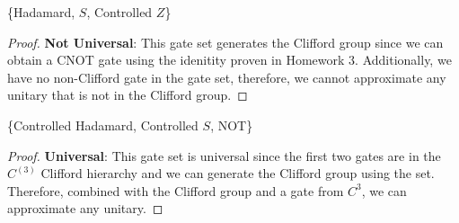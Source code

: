 \begin{solution}[label=ques:4e]
  \begin{question}
    \{Hadamard, $S$, Controlled $Z$\}
  \end{question}
  \tcblower{}
  \begin{proof}
    \textbf{Not Universal}: This gate set generates the Clifford group since we can obtain a CNOT gate using the idenitity proven in Homework 3. Additionally, we have no non-Clifford gate in the gate set, therefore, we cannot approximate any unitary that is not in the Clifford group.
  \end{proof}
\end{solution}

\begin{solution}[label=ques:4f]
  \begin{question}
    \{Controlled Hadamard, Controlled $S$, NOT\} 
  \end{question}
  \tcblower{}
  \begin{proof}
    \textbf{Universal}: This gate set is universal since the first two gates are in the $C^{(3)}$ Clifford hierarchy and we can generate the Clifford group using the set. Therefore, combined with the Clifford group and a gate from $C^3$, we can approximate any unitary.
  \end{proof}
\end{solution}
